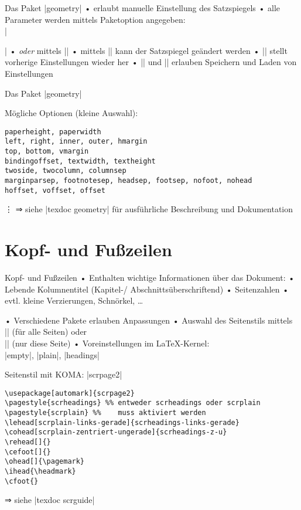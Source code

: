 \begin{frame}[fragile]{Das Paket |geometry|}
• erlaubt manuelle Einstellung des Satzspiegels
• alle Parameter werden mittels Paketoption angegeben:\\%
|\usepackage[top=2cm,bottom=5cm]{geometry}|
• \emph{oder} mittels |\geometry{top=2cm,bottom=5cm}|
• mittels |\newgeometry| kann der Satzspiegel geändert werden
• |\restoregeometry| stellt vorherige Einstellungen wieder her
• |\savegeometry{}| und |\loadgeometry{}| erlauben Speichern und Laden von Einstellungen
\•
\end{frame}

\begin{frame}[fragile]{Das Paket |geometry|}
\begin{block}{Mögliche Optionen (kleine Auswahl):}
\begin{verbatim}
paperheight, paperwidth
left, right, inner, outer, hmargin
top, bottom, vmargin
bindingoffset, textwidth, textheight
twoside, twocolumn, columnsep
marginparsep, footnotesep, headsep, footsep, nofoot, nohead
hoffset, voffset, offset
\end{verbatim}
\vdots 
⇒ siehe |texdoc geometry| für ausführliche Beschreibung und Dokumentation
\end{block}
\end{frame}

\section{Kopf- und Fußzeilen}
\begin{frame}[fragile]{Kopf- und Fußzeilen}
• Enthalten wichtige Informationen über das Dokument:
• Lebende Kolumnentitel (Kapitel-/ Abschnittsüberschriftend)
• Seitenzahlen
• evtl. kleine Verzierungen, Schnörkel, …
\•
\pause

• Verschiedene Pakete erlauben Anpassungen
• Auswahl des Seitenstils mittels\\%
|\pagestyle{Seitenstil}| (für alle Seiten) oder\\%
 |\thispagestyle{Seitenstil}| (nur diese Seite)
• Voreinstellungen im \LaTeX-Kernel:\\%
 |empty|, |plain|, |headings|
\•
\end{frame}

\begin{frame}[fragile]{Seitenstil mit KOMA: |scrpage2|}
\begin{lstlisting}
\usepackage[automark]{scrpage2}
\pagestyle{scrheadings} %% entweder scrheadings oder scrplain
\pagestyle{scrplain} %%    muss aktiviert werden
\lehead[scrplain-links-gerade]{scrheadings-links-gerade}
\cohead[scrplain-zentriert-ungerade]{scrheadings-z-u}
\rehead[]{}
\cefoot[]{}
\ohead[]{\pagemark}
\ihead{\headmark}
\cfoot{}
\end{lstlisting}
⇒ siehe |texdoc scrguide|
\end{frame}

